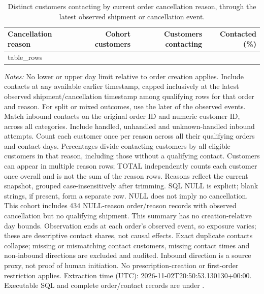 \begin{table}[!htbp]
\centering
\caption{Distinct customers contacting by current order cancellation reason, through the latest observed shipment or cancellation event.}
\label{tab:customer-contacts-by-cancellation-reason}
\small
\begin{tabular}{@{}lrrr@{}}
\toprule
Cancellation reason & Cohort customers & Customers contacting & Contacted (\%) \\
\midrule
{{ table_rows }}
\bottomrule
\end{tabular}

\begin{minipage}{\linewidth}
\footnotesize
\textit{Notes:} No lower or upper day limit relative to order creation applies.
Include contacts at any available earlier timestamp, capped inclusively at the
latest observed shipment/cancellation timestamp among
qualifying rows for that order and reason. For split or mixed outcomes, use the
later of the observed events. Match inbound contacts on the original order ID
and numeric customer ID, across all categories. Include handled, unhandled and unknown-handled inbound attempts.
Count each customer once per reason across all their qualifying orders and
contact days. Percentages divide contacting customers by all eligible customers
in that reason, including those without a qualifying contact. Customers can
appear in multiple reason rows; TOTAL independently counts each customer once
overall and is not the sum of the reason rows. Reasons reflect the current
snapshot, grouped case-insensitively after trimming. SQL NULL is explicit;
blank strings, if present, form a separate row. NULL does not imply no cancellation.
This cohort includes 434
NULL-reason order/reason records with observed cancellation but no qualifying
shipment. This summary has no creation-relative day bounds.
Observation ends at each order's observed
event, so exposure varies; these are descriptive contact shares, not causal effects.
Exact duplicate contacts collapse; missing or mismatching contact customers,
missing contact times and non-inbound directions are excluded and audited.
Inbound direction is a source proxy, not proof of human initiation.
No prescription-creation or first-order restriction applies.
Extraction time (UTC): 2026-11-02T20:50:53.130130+00:00.
Executable SQL and complete order/contact records are under
.
\end{minipage}
\end{table}
